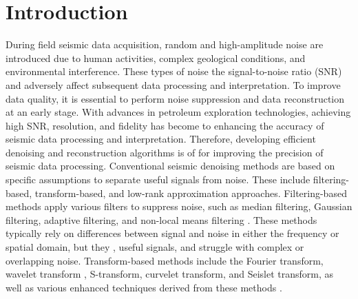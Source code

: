\documentclass[preprint,12pt,authoryear]{elsarticle}
\begin{document}
\section{Introduction}
\label{sec1}
During field seismic data acquisition, random and high-amplitude noise are introduced due to human activities, complex geological conditions, and environmental interference. 
These types of noise  the signal-to-noise ratio (SNR) and adversely affect subsequent data processing and interpretation. To improve data quality, it is essential to perform noise suppression and data reconstruction at an early stage. With advances in petroleum exploration technologies, achieving high SNR, resolution, and fidelity has become  to enhancing the accuracy of seismic data processing and interpretation. Therefore, developing efficient denoising and reconstruction algorithms is of  for improving the precision of seismic data processing.
Conventional seismic denoising methods are based on specific assumptions to separate useful signals from noise. 
These include filtering-based, transform-based, and low-rank approximation approaches. 
Filtering-based methods apply various filters to suppress noise, such as median filtering, Gaussian filtering, adaptive filtering, and non-local means filtering \citep{bednar1983median,cao2018adaptive,wu2011radial,buades2008nonlocal}. 
These methods typically rely on differences between signal and noise in either the frequency or spatial domain, but they ,  useful signals, and struggle with complex or overlapping noise. Transform-based methods include the Fourier transform, wavelet transform \citep{xia1994wavelet}, S-transform, curvelet transform, and Seislet transform, as well as various enhanced techniques derived from these methods \citep{zhang2019curvelet,xia1994wavelet,pinnegar2003stransform,li2020surfacewave,fomel2006seislet, liu2009seislet}.
\end{document}
